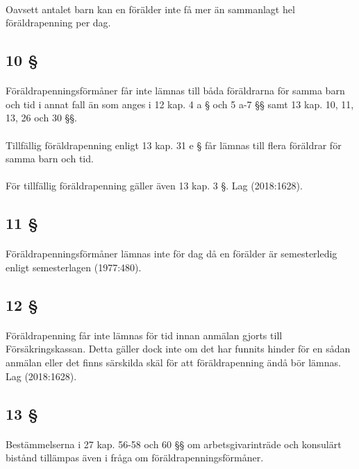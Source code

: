 \documentclass[a4paper,notitlepage,openany,10pt]{book}
\begin{document}
\paragraph*{}
Oavsett antalet barn kan en förälder inte få mer än sammanlagt hel föräldrapenning per dag.
\subsection*{10 §}
\paragraph*{}
Föräldrapenningsförmåner får inte lämnas till båda föräldrarna för samma barn och tid i annat fall än som anges i 12 kap. 4 a § och 5 a-7 §§ samt 13 kap. 10, 11, 13, 26 och 30 §§.
\paragraph*{}
Tillfällig föräldrapenning enligt 13 kap. 31 e § får lämnas till flera föräldrar för samma barn och tid.
\paragraph*{}
För tillfällig föräldrapenning gäller även 13 kap. 3 §.
Lag (2018:1628).
\subsection*{11 §}
\paragraph*{}
Föräldrapenningsförmåner lämnas inte för dag då en förälder är semesterledig enligt semesterlagen (1977:480).
\subsection*{12 §}
\paragraph*{}
Föräldrapenning får inte lämnas för tid innan anmälan gjorts till Försäkringskassan. Detta gäller dock inte om det har funnits hinder för en sådan anmälan eller det finns särskilda skäl för att föräldrapenning ändå bör lämnas.
Lag (2018:1628).
\subsection*{13 §}
\paragraph*{}
Bestämmelserna i 27 kap. 56-58 och 60 §§ om arbetsgivarinträde och konsulärt bistånd tillämpas även i fråga om föräldrapenningsförmåner.
\end{document}
